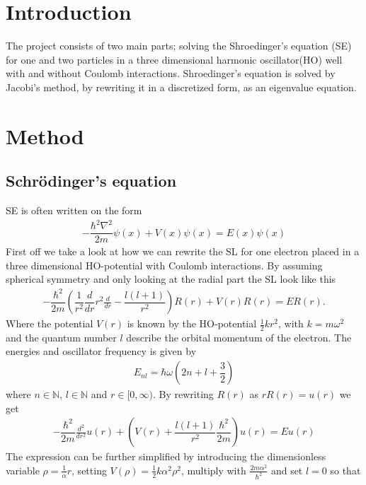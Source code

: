\section{Introduction} {
    The project consists of two main parts; solving the Shroedinger's equation (SE) for one and two particles in a three dimensional harmonic oscillator(HO) well with and without Coulomb interactions.
    Shroedinger's equation is solved by Jacobi's method, by rewriting it in a discretized form, as an eigenvalue equation.
}

\section{Method} {

    \subsection{Schrödinger's equation} {
        SE is often written on the form
            \begin{align*}
                -\dfrac{\hbar^2 \nabla^2}{2m}\psi(x) + V(x)\psi(x) = E(x)\psi(x)
            \end{align*}
        First off we take a look at how we can rewrite the SL for one electron placed in a three dimensional HO-potential with Coulomb interactions. By assuming spherical symmetry and only looking at the radial part the SL look like this
            \begin{align*}
                  -\dfrac{\hbar^2}{2 m} \left ( \dfrac{1}{r^2} \dfrac{d}{dr} r^2 \frac{d}{dr} - \dfrac{l (l + 1)}{r^2} \right )R(r) + V(r) R(r) = E R(r).
            \end{align*}
        Where the potential $V(r)$ is known by the HO-potential $\frac{1}{2}kr^2$, with $k=m\omega^2$ and the quantum number $l$ describe the orbital momentum of the electron.
        The energies and oscillator frequency is given by
            \begin{align*}
                E_{nl} = \hbar\omega\left(2n+l+ \dfrac{3}{2} \right)
            \end{align*}
        where $n\in \mathbb N$, $l\in \mathbb N$ and $r \in [0,\infty)$. By rewriting $R(r)$ as $rR(r) = u(r)$ we get
            \begin{align*}
                -\dfrac{\hbar^2}{2 m} \frac{d^2}{dr^2} u(r) + \left ( V(r) + \dfrac{l (l + 1)}{r^2}\dfrac{\hbar^2}{2 m} \right ) u(r)  = E u(r)
            \end{align*}
        The expression can be further simplified by introducing the dimensionless variable $\rho = \frac{1}{\alpha}r$, setting $V(\rho) = \frac{1}{2}k\alpha^2\rho^2$, multiply with $\frac{2m\alpha^2}{\hbar^2}$ and set $l=0$ so that
}}
